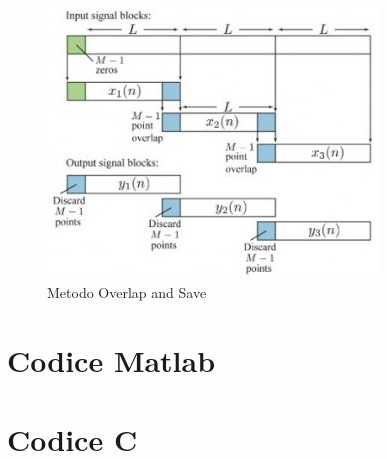 \documentclass[12pt,a4paper,titlepage]{article}
\begin{document}
\begin{figure}[h]
	\centering	
	\includegraphics[width=.7\textwidth]{Immagini/ols}
	\caption{Metodo Overlap and Save}
	\label{fig:ols}
\end{figure}

\section{Codice Matlab}

\section{Codice C}

\clearpage

\nocite{*}
\printbibliography
\end{document}
